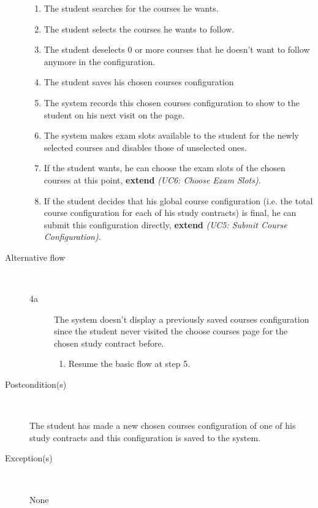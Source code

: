 \begin{description}
\begin{enumerate}
	  	\item The student searches for the courses he wants.
	  	\item The student selects the courses he wants to follow.
	  	\item The student deselects 0 or more courses that he doesn't want to
	  	follow anymore in the configuration.
	  	\item The student saves his chosen courses configuration
	  	\item The system records this chosen courses configuration to show to the
	  	student on his next visit on the page.
	  	\item The system makes exam slots available to the student for the newly
	  	selected courses and disables those of unselected ones.
	  	\item If the student wants, he can choose the exam slots of the chosen
	  	courses at this point, \textbf{extend} \emph{(UC6: Choose Exam Slots)}.
	  	\item If the student decides that his global course configuration (i.e. the
	  	total course configuration for each of his study contracts) is final, he
	  	can submit this configuration directly, \textbf{extend} \emph{(UC5: Submit
	  	Course Configuration)}.
	\end{enumerate}
	\item[Alternative flow] \
		\begin{description}
		\item[4a] The system doesn't display a previously saved courses
		configuration since the student never visited the choose courses page for the
		chosen study contract before.
			\begin{enumerate}
			  \item Resume the basic flow at step 5.
			\end{enumerate}
		\end{description}
	\item[Postcondition(s)] \ 
		\par The student has made a new chosen courses configuration of one of his 
		study contracts and this configuration is saved to the system.
	\item[Exception(s)] \ 
		\par None
\end{description}